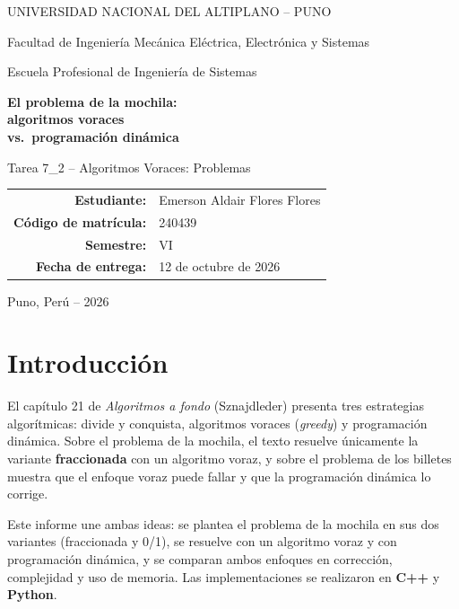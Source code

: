 \documentclass[12pt,a4paper]{article}
\begin{document}
\begin{titlepage}
\centering
{\large UNIVERSIDAD NACIONAL DEL ALTIPLANO -- PUNO\par}
{\large Facultad de Ingeniería Mecánica Eléctrica, Electrónica y Sistemas\par}
{\large Escuela Profesional de Ingeniería de Sistemas\par}
\vspace{2.5cm}
{\Huge\bfseries El problema de la mochila:\\[0.3cm] algoritmos voraces\\[0.3cm] vs.\ programación dinámica\par}
\vspace{1.5cm}
{\Large Tarea 7\_2 -- Algoritmos Voraces: Problemas\par}
\vspace{3cm}
\begin{tabular}{rl}
\textbf{Estudiante:} & Emerson Aldair Flores Flores \\
\textbf{Código de matrícula:} & 240439 \\
\textbf{Semestre:} & VI \\
\textbf{Fecha de entrega:} & 12 de octubre de 2026 \\
\end{tabular}
\vfill
{\large Puno, Perú -- 2026\par}
\end{titlepage}

\tableofcontents
\newpage

\section{Introducción}
El capítulo 21 de \emph{Algoritmos a fondo} (Sznajdleder) presenta tres estrategias algorítmicas: divide y conquista, algoritmos voraces (\emph{greedy}) y programación dinámica. Sobre el problema de la mochila, el texto resuelve únicamente la variante \textbf{fraccionada} con un algoritmo voraz, y sobre el problema de los billetes muestra que el enfoque voraz puede fallar y que la programación dinámica lo corrige.

Este informe une ambas ideas: se plantea el problema de la mochila en sus dos variantes (fraccionada y 0/1), se resuelve con un algoritmo voraz y con programación dinámica, y se comparan ambos enfoques en corrección, complejidad y uso de memoria. Las implementaciones se realizaron en \textbf{C++} y \textbf{Python}.
\end{document}

